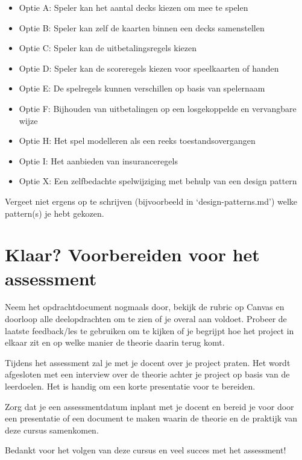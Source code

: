 \begin{itemize}
    \item Optie A: Speler kan het aantal decks kiezen om mee te spelen
    \item Optie B: Speler kan zelf de kaarten binnen een decks samenstellen
    \item Optie C: Speler kan de uitbetalingsregels kiezen
    \item Optie D: Speler kan de scoreregels kiezen voor speelkaarten of handen
    \item Optie E: De spelregels kunnen verschillen op basis van spelernaam
    \item Optie F: Bijhouden van uitbetalingen op een losgekoppelde en vervangbare wijze
    \item Optie H: Het spel modelleren als een reeks toestandsovergangen
    \item Optie I: Het aanbieden van insuranceregels
    \item Optie X: Een zelfbedachte spelwijziging met behulp van een design pattern    
\end{itemize}

Vergeet niet ergens op te schrijven (bijvoorbeeld in `design-patterns.md')
welke pattern(s) je hebt gekozen.

\newpage
\section{Klaar? Voorbereiden voor het assessment}
Neem het opdrachtdocument nogmaals door, bekijk de rubric op Canvas en doorloop alle deelopdrachten 
om te zien of je overal aan voldoet. 
Probeer de laatste feedback/les te gebruiken om te kijken of je begrijpt hoe het project in elkaar
zit en op welke manier de theorie daarin terug komt.

Tijdens het assessment zal je met je docent over je project praten.
Het wordt afgesloten met een interview over de theorie achter je project
op basis van de leerdoelen.
Het is handig om een korte presentatie voor te bereiden.

Zorg dat je een assessmentdatum inplant met je docent en bereid je voor door een presentatie of 
een document te maken waarin de theorie en de praktijk van deze cursus samenkomen.

Bedankt voor het volgen van deze cursus en veel succes met het assessment!